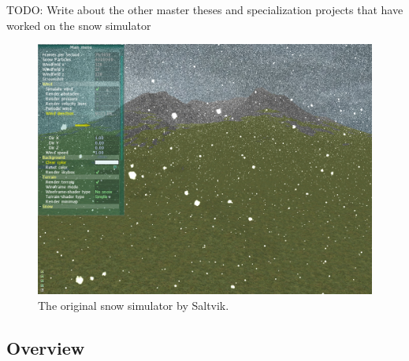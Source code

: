 TODO: Write about the other master theses and specialization projects that 
have worked on the snow simulator

\begin{figure}[ht]
	\center
	\includegraphics[width=1.0\textwidth]{images/snow/gpu/snow7}
	\caption{The original snow simulator by Saltvik.}
	\label{fig:gpuSnow}
\end{figure}

%

\subsection{Overview}

